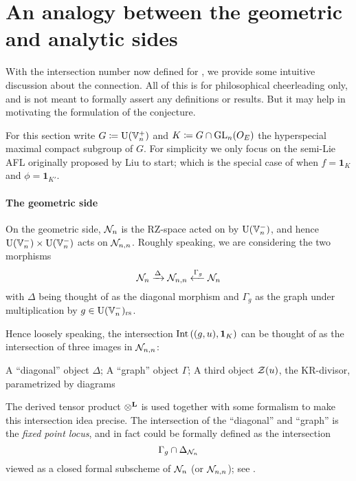 \section{An analogy between the geometric and analytic sides}
With the intersection number now defined for ,
we provide some intuitive discussion about the connection.
All of this is for philosophical cheerleading only,
and is not meant to formally assert any definitions or results.
But it may help in motivating the formulation of the conjecture.

For this section write $G \coloneqq \operatorname{U}(\mathbb V_n^+)$ and $K \coloneqq G \cap \operatorname{GL}_n(O_E)$
the hyperspecial maximal compact subgroup of $G$.
For simplicity we only focus on the semi-Lie AFL originally proposed by Liu to start;
which is the special case of 
when $f = \mathbf{1}_K$ and $\phi = \mathbf{1}_{K'}$.

\paragraph{The geometric side}
On the geometric side, $\mathcal N_n$ is the RZ-space acted on by $\operatorname{U}(\mathbb V_n^-)$,
and hence $\operatorname{U}(\mathbb V_n^-) \times \operatorname{U}(\mathbb V_n^-)$ acts on $\mathcal N_{n,n}$.
Roughly speaking, we are considering the two morphisms
\[ \mathcal N_n \xrightarrow{\Delta} \mathcal N_{n,n} \xleftarrow{\Gamma_g} \mathcal N_n \]
with $\Delta$ being thought of as the diagonal morphism
and $\Gamma_g$ as the graph under multiplication by $g \in \operatorname{U}(\mathbb V_n^-)_{\mathrm{rs}}$.

Hence loosely speaking, the intersection $\operatorname{Int}\left( (g,u), \mathbf{1}_K \right)$
can be thought of as the intersection of three images in $\mathcal N_{n,n}$:
\begin{itemize}
  \ii A ``diagonal'' object $\Delta$;
  \ii A ``graph'' object $\Gamma$;
  \ii A third object $\mathcal Z(u)$, the KR-divisor, parametrized by diagrams
  \begin{center}
  \end{center}
\end{itemize}
The derived tensor product $\mathop{\otimes}^{\mathbf{L}}$
is used together with some formalism to make this intersection idea precise.
The intersection of the ``diagonal'' and ``graph'' is the \emph{fixed point locus},
and in fact could be formally defined as the intersection
\[ \Gamma_g \cap \Delta_{\mathcal N_n} \]
viewed as a closed formal subscheme of $\mathcal N_n$ (or $\mathcal N_{n,n}$);
see \cite[Equation (4.6)]{ref:survey}.

